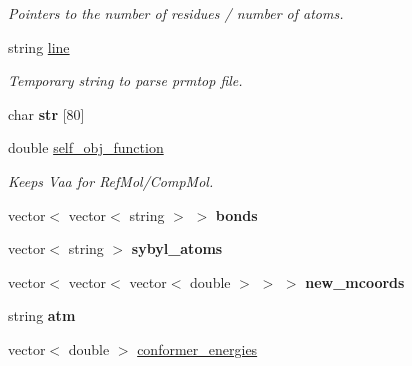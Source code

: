 \begin{DoxyCompactItemize}
\begin{DoxyCompactList}\small\item\em Pointers to the number of residues / number of atoms. \item\end{DoxyCompactList}\item 
\hypertarget{classMol2_a67ceb39981358eff84552a6eefa21065}{
string \hyperlink{classMol2_a67ceb39981358eff84552a6eefa21065}{line}}
\label{classMol2_a67ceb39981358eff84552a6eefa21065}

\begin{DoxyCompactList}\small\item\em Temporary string to parse prmtop file. \item\end{DoxyCompactList}\item 
\hypertarget{classMol2_a6041f89cb497b7bd329a7d2de0bdd164}{
char {\bfseries str} \mbox{[}80\mbox{]}}
\label{classMol2_a6041f89cb497b7bd329a7d2de0bdd164}

\item 
\hypertarget{classMol2_adc7bfbbd47db76a1754510a21617a243}{
double \hyperlink{classMol2_adc7bfbbd47db76a1754510a21617a243}{self\_\-obj\_\-function}}
\label{classMol2_adc7bfbbd47db76a1754510a21617a243}

\begin{DoxyCompactList}\small\item\em Keeps Vaa for RefMol/CompMol. \item\end{DoxyCompactList}\item 
\hypertarget{classMol2_a3be83bf91977f14cd2b8d2d9571f770f}{
vector$<$ vector$<$ string $>$ $>$ {\bfseries bonds}}
\label{classMol2_a3be83bf91977f14cd2b8d2d9571f770f}

\item 
\hypertarget{classMol2_a5a55037dab7bfc93bbc79be4370d4cb0}{
vector$<$ string $>$ {\bfseries sybyl\_\-atoms}}
\label{classMol2_a5a55037dab7bfc93bbc79be4370d4cb0}

\item 
\hypertarget{classMol2_a9a288053790fae593b7a83fa4c0fdf46}{
vector$<$ vector$<$ vector$<$ double $>$ $>$ $>$ {\bfseries new\_\-mcoords}}
\label{classMol2_a9a288053790fae593b7a83fa4c0fdf46}

\item 
\hypertarget{classMol2_a91fdebbbedf3445c41bd69f50ce7fffa}{
string {\bfseries atm}}
\label{classMol2_a91fdebbbedf3445c41bd69f50ce7fffa}

\item 
\hypertarget{classMol2_ab8b46ba77418c59d655e7fff5a5ac988}{
vector$<$ double $>$ \hyperlink{classMol2_ab8b46ba77418c59d655e7fff5a5ac988}{conformer\_\-energies}}
\label{classMol2_ab8b46ba77418c59d655e7fff5a5ac988}


\end{DoxyCompactItemize}
